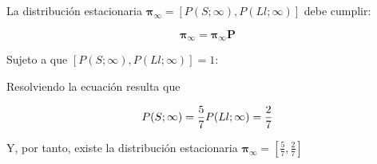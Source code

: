 \documentclass[11pt]{article}
\begin{document}
    La distribución estacionaria
\(\boldsymbol{\pi_\infty}=[P(S;\infty), P(Ll;\infty)]\) debe cumplir:

\[
\boldsymbol{\pi_\infty} = \boldsymbol{\pi_\infty}\mathbf{P}
\]

Sujeto a que \([P(S;\infty), P(Ll;\infty)] = 1\):

Resolviendo la ecuación resulta que

\[
P(S;\infty) = \frac{5}{7}\\
P(Ll;\infty) = \frac{2}{7}  
\]

Y, por tanto, existe la distribución estacionaria
\(\boldsymbol{\pi_\infty}=[\frac{5}{7}, \frac{2}{7}]\)


    
    
    
    
\end{document}
